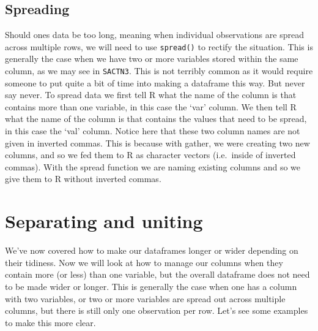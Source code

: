 \documentclass[]{book}
\newenvironment{Shaded}{\begin{snugshade}}{\end{snugshade}}
\newcommand{\KeywordTok}[1]{\textcolor[rgb]{0.13,0.29,0.53}{\textbf{#1}}}
\newcommand{\DataTypeTok}[1]{\textcolor[rgb]{0.13,0.29,0.53}{#1}}
\newcommand{\StringTok}[1]{\textcolor[rgb]{0.31,0.60,0.02}{#1}}
\newcommand{\OperatorTok}[1]{\textcolor[rgb]{0.81,0.36,0.00}{\textbf{#1}}}
\newcommand{\NormalTok}[1]{#1}
\theoremstyle{definition}
\theoremstyle{definition}
\theoremstyle{definition}
\theoremstyle{remark}
\begin{document}
\begin{Shaded}
\end{Shaded}

\subsection{Spreading}\label{spreading}

Should ones data be too long, meaning when individual observations are
spread across multiple rows, we will need to use \texttt{spread()} to
rectify the situation. This is generally the case when we have two or
more variables stored within the same column, as we may see in
\texttt{SACTN3}. This is not terribly common as it would require someone
to put quite a bit of time into making a dataframe this way. But never
say never. To spread data we first tell R what the name of the column is
that contains more than one variable, in this case the `var' column. We
then tell R what the name of the column is that contains the values that
need to be spread, in this case the `val' column. Notice here that these
two column names are not given in inverted commas. This is because with
gather, we were creating two new columns, and so we fed them to R as
character vectors (i.e.~inside of inverted commas). With the spread
function we are naming existing columns and so we give them to R without
inverted commas.

\begin{Shaded}
\end{Shaded}

\section{Separating and uniting}\label{separating-and-uniting}

We've now covered how to make our dataframes longer or wider depending
on their tidiness. Now we will look at how to manage our columns when
they contain more (or less) than one variable, but the overall dataframe
does not need to be made wider or longer. This is generally the case
when one has a column with two variables, or two or more variables are
spread out across multiple columns, but there is still only one
observation per row. Let's see some examples to make this more clear.
\end{document}
